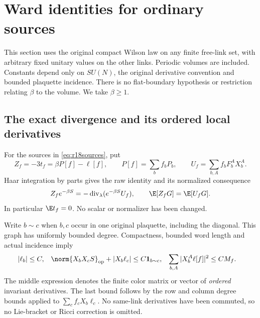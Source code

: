 \section{Ward identities for ordinary sources}
\label{ww:section}

This section uses the original compact Wilson law on any finite free-link set, with arbitrary fixed unitary values on the other links. Periodic volumes are included. Constants depend only on $SU(N)$, the original derivative convention and bounded plaquette incidence. There is no flat-boundary hypothesis or restriction relating $\beta$ to the volume. We take $\beta\ge1$.

\subsection{The exact divergence and its ordered local derivatives}

For the sources in \eqref{eq:r18sources}, put
\begin{equation}
 Z_f=-3t_f=\beta P[f]-\ell[f],\qquad
 P[f]=\sum_bf_bP_b,\qquad
 U_f=\sum_{b,A}f_bF_b^AX_b^A.
 \label{ww:definitions}
\end{equation}
Haar integration by parts gives the raw identity and its normalized consequence
\begin{equation}
 Z_fe^{-\beta S}=-\operatorname{div}_{\lambda}(e^{-\beta S}U_f),
 \qquad
 \E[Z_fG]=\E[U_fG].
 \label{ww:ibp}
\end{equation}
In particular $\E t_f=0$. No scalar or normalizer has been changed.

Write $b\sim c$ when $b,c$ occur in one original plaquette, including the diagonal. This graph has uniformly bounded degree. Compactness, bounded word length and actual incidence imply
\begin{align}
 |\ell_b|&\le C,&
 \norm{X_bX_cS}_{\mathrm{op}}+|X_b\ell_c|
     &\le C\mathbf1_{b\sim c},&
 \sum_{b,A}|X_b^A\ell[f]|^2&\le CM_f.
 \label{ww:local}
\end{align}
The middle expression denotes the finite color matrix or vector of \emph{ordered} invariant derivatives. The last bound follows by the row and column degree bounds applied to $\sum_cf_cX_b\ell_c$. No same-link derivatives have been commuted, so no Lie-bracket or Ricci correction is omitted.

